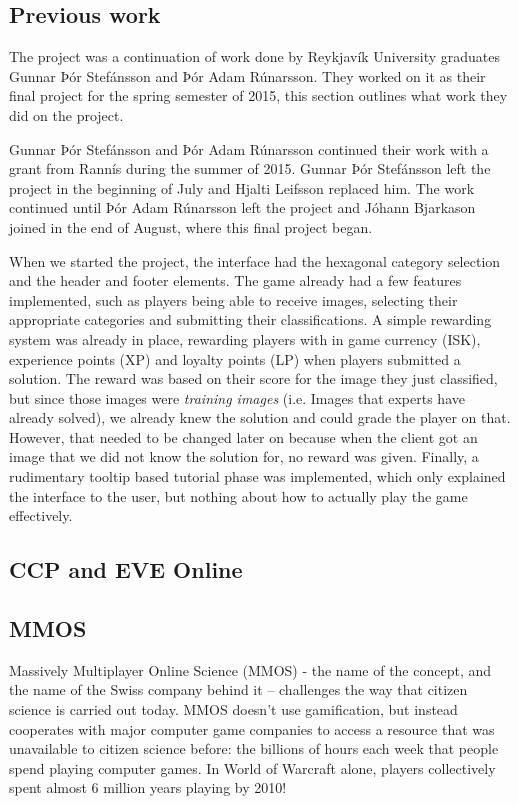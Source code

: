 
\subsection{Previous work}
	The project was a continuation of work done by Reykjavík University graduates Gunnar Þór Stefánsson and Þór Adam Rúnarsson. They worked on it as their final project for the spring semester of 2015, this section outlines what work they did on the project. 

	Gunnar Þór Stefánsson and Þór Adam Rúnarsson continued their work with a grant from Rannís during the summer of 2015. Gunnar Þór Stefánsson left the project in the beginning of July and Hjalti Leifsson replaced him. The work continued until Þór Adam Rúnarsson left the project and Jóhann Bjarkason joined in the end of August, where this final project began.

	When we started the project, the interface had the hexagonal category selection and the header and footer elements. The game already had a few features implemented, such as players being able to receive images, selecting their appropriate categories and submitting their classifications.
	A simple rewarding system was already in place, rewarding players with in game currency (ISK), experience points (XP) and loyalty points (LP) when players submitted a solution. The reward was based on their score for the image they just classified, but since those images were \emph{training images} (i.e. Images that experts have already solved), we already knew the solution and could grade the player on that. However, that needed to be changed later on because when the client got an image that we did not know the solution for, no reward was given.
	Finally, a rudimentary tooltip based tutorial phase was implemented, which only explained the interface to the user, but nothing about how to actually play the game effectively.

\subsection{CCP and EVE Online}
	

\subsection{MMOS}

	Massively Multiplayer Online Science (MMOS) - the name of the concept, and the name of the Swiss company behind it – challenges the way that citizen science is	carried out today. MMOS doesn’t use gamification, but instead cooperates with major	computer game companies to access a resource that was unavailable to citizen science before: the billions of hours each week that people spend playing computer	games. In World of Warcraft alone, players collectively spent almost 6 million years playing by 2010!

